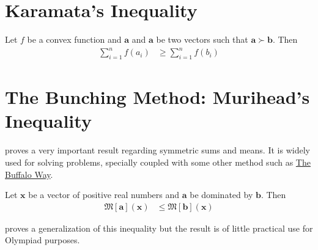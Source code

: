 \documentclass[inequalities.tex]{subfile}
\begin{document}
	\section[Karamata]{Karamata's Inequality}\label{sec:karamata}
	
		\begin{theorem}
			Let $f$ be a convex function and $\mathbf{a}$ and $\mathbf{a}$ be two vectors such that $\mathbf{a}\succ\mathbf{b}$. Then
				\begin{align*}
					\sum_{i=1}^{n}f(a_{i})
						& \geq \sum_{i=1}^{n}f(b_{i})
				\end{align*}
		\end{theorem}
	\section[Bunching: Murihead]{The Bunching Method: Murihead's Inequality}\label{sec:bunching}
	
	\textcite{muirhead_1902} proves a very important result regarding symmetric sums and means. It is widely used for solving problems, specially coupled with some other method such as \hyperref[ch:buffalo]{The Buffalo Way}.
		\begin{theorem}
			Let $\mathbf{x}$ be a vector of positive real numbers and $\mathbf{a}$ be dominated by $\mathbf{b}$. Then
				\begin{align*}
					\mathfrak{M}[\mathbf{a}](\mathbf{x})
						& \leq \mathfrak{M}[\mathbf{b}](\mathbf{x})
				\end{align*}
		\end{theorem}
	\textcite{paris_vencovska_2009} proves a generalization of this inequality but the result is of little practical use for Olympiad purposes.
		\begin{theorem}
			
		\end{theorem}
\end{document}
